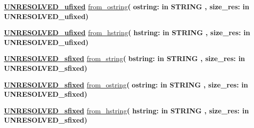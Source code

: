 \begin{DoxyCompactItemize}
\item 
{\bfseries {\bfseries {\bfseries \hyperlink{classfixed__pkg_ae78bc2b36d22f6abeac163955e8a587d}{U\+N\+R\+E\+S\+O\+L\+V\+E\+D\+\_\+ufixed}} \textcolor{vhdlchar}{ }}} \hyperlink{classfixed__pkg_a6d1d9e86789f0f1a451f92f85640396f}{from\+\_\+ostring}{\bfseries  ( }{\bfseries \textcolor{vhdlchar}{ostring\+: }\textcolor{stringliteral}{in }{\bfseries \textcolor{comment}{S\+T\+R\+I\+N\+G}\textcolor{vhdlchar}{ }}}{\bfseries  , \textcolor{vhdlchar}{size\+\_\+res\+: }\textcolor{stringliteral}{in }\textcolor{vhdlchar}{U\+N\+R\+E\+S\+O\+L\+V\+E\+D\+\_\+ufixed}}{\bfseries  )} 
\item 
{\bfseries {\bfseries {\bfseries \hyperlink{classfixed__pkg_ae78bc2b36d22f6abeac163955e8a587d}{U\+N\+R\+E\+S\+O\+L\+V\+E\+D\+\_\+ufixed}} \textcolor{vhdlchar}{ }}} \hyperlink{classfixed__pkg_a2b290e41375b7067bea0da8031b9d434}{from\+\_\+hstring}{\bfseries  ( }{\bfseries \textcolor{vhdlchar}{hstring\+: }\textcolor{stringliteral}{in }{\bfseries \textcolor{comment}{S\+T\+R\+I\+N\+G}\textcolor{vhdlchar}{ }}}{\bfseries  , \textcolor{vhdlchar}{size\+\_\+res\+: }\textcolor{stringliteral}{in }\textcolor{vhdlchar}{U\+N\+R\+E\+S\+O\+L\+V\+E\+D\+\_\+ufixed}}{\bfseries  )} 
\item 
{\bfseries {\bfseries {\bfseries \hyperlink{classfixed__pkg_aa723b28a027c3c0f9bca02d75e8df4d6}{U\+N\+R\+E\+S\+O\+L\+V\+E\+D\+\_\+sfixed}} \textcolor{vhdlchar}{ }}} \hyperlink{classfixed__pkg_a03e4e32f0028050c120a971c541ccde3}{from\+\_\+string}{\bfseries  ( }{\bfseries \textcolor{vhdlchar}{bstring\+: }\textcolor{stringliteral}{in }{\bfseries \textcolor{comment}{S\+T\+R\+I\+N\+G}\textcolor{vhdlchar}{ }}}{\bfseries  , \textcolor{vhdlchar}{size\+\_\+res\+: }\textcolor{stringliteral}{in }\textcolor{vhdlchar}{U\+N\+R\+E\+S\+O\+L\+V\+E\+D\+\_\+sfixed}}{\bfseries  )} 
\item 
{\bfseries {\bfseries {\bfseries \hyperlink{classfixed__pkg_aa723b28a027c3c0f9bca02d75e8df4d6}{U\+N\+R\+E\+S\+O\+L\+V\+E\+D\+\_\+sfixed}} \textcolor{vhdlchar}{ }}} \hyperlink{classfixed__pkg_ab56a504111d706bf1d60a6018c706381}{from\+\_\+ostring}{\bfseries  ( }{\bfseries \textcolor{vhdlchar}{ostring\+: }\textcolor{stringliteral}{in }{\bfseries \textcolor{comment}{S\+T\+R\+I\+N\+G}\textcolor{vhdlchar}{ }}}{\bfseries  , \textcolor{vhdlchar}{size\+\_\+res\+: }\textcolor{stringliteral}{in }\textcolor{vhdlchar}{U\+N\+R\+E\+S\+O\+L\+V\+E\+D\+\_\+sfixed}}{\bfseries  )} 
\item 
{\bfseries {\bfseries {\bfseries \hyperlink{classfixed__pkg_aa723b28a027c3c0f9bca02d75e8df4d6}{U\+N\+R\+E\+S\+O\+L\+V\+E\+D\+\_\+sfixed}} \textcolor{vhdlchar}{ }}} \hyperlink{classfixed__pkg_a406a5f8022635c932b98bf9a276674bf}{from\+\_\+hstring}{\bfseries  ( }{\bfseries \textcolor{vhdlchar}{hstring\+: }\textcolor{stringliteral}{in }{\bfseries \textcolor{comment}{S\+T\+R\+I\+N\+G}\textcolor{vhdlchar}{ }}}{\bfseries  , \textcolor{vhdlchar}{size\+\_\+res\+: }\textcolor{stringliteral}{in }\textcolor{vhdlchar}{U\+N\+R\+E\+S\+O\+L\+V\+E\+D\+\_\+sfixed}}{\bfseries  )} 

\end{DoxyCompactItemize}
